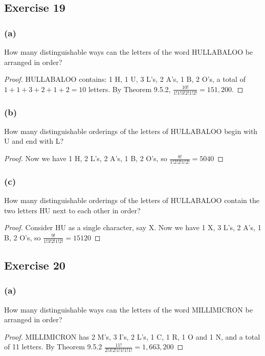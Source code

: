 \documentclass[14pt]{extarticle}
\newcommand{\dps}{\displaystyle}
\begin{document}
\subsection{Exercise 19}
\subsubsection{(a)}
How many distinguishable ways can the letters of the word HULLABALOO be arranged in order?

\begin{proof}
     HULLABALOO contains: 1 H, 1 U, 3 L's, 2 A's, 1 B, 2 O's, a total of \(1+1+3+2+1+2 = 10\) letters. By Theorem 9.5.2,
     \(\dps\frac{10!}{1!1!3!2!1!2!} = 151,200\).
\end{proof}

\subsubsection{(b)}
How many distinguishable orderings of the letters of HULLABALOO begin with U and end with L?

\begin{proof}
     Now we have 1 H, 2 L's, 2 A's, 1 B, 2 O's, so \(\dps\frac{8!}{1!2!2!1!2!} = 5040\)
\end{proof}

\subsubsection{(c)}
How many distinguishable orderings of the letters of HULLABALOO contain the two letters HU next to each other in
order?

\begin{proof}
     Consider HU as a single character, say X. Now we have 1 X, 3 L's, 2 A's, 1 B, 2 O's, so \(\frac{9!}{1!3!2!1!2!} = 15120\)
\end{proof}

\subsection{Exercise 20}
\subsubsection{(a)}
How many distinguishable ways can the letters of the word MILLIMICRON be arranged in order?

\begin{proof}
     MILLIMICRON has 2 M's, 3 I's, 2 L's, 1 C, 1 R, 1 O and 1 N, and a total of 11 letters. By Theorem 9.5.2
     \(\frac{11!}{2!3!2!1!1!1!1!} = 1,663,200\)
\end{proof}
\end{document}
